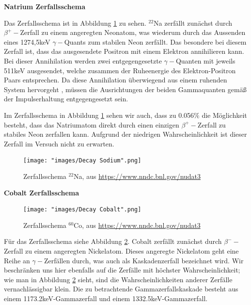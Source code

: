 \documentclass[%
aps,
onecolumn,
11pt,
tightenlines,
nofootinbib,
superscriptaddress,
floatfix,
prd,
]{revtex4-2}
\begin{document}
\textbf{Natrium Zerfallsschema} \par
Das Zerfallsschema ist in Abbildung \ref{fig:decaysodium} zu sehen. $^{22}$Na zerfällt zunächst durch $\beta^+ -$Zerfall zu einem angeregten Neonatom, was wiederum durch das Aussenden eines 1274,5keV $\gamma-$Quants zum stabilen Neon zerfällt. Das besondere bei diesem Zerfall ist, dass das ausgesendete Positron mit einem Elektron annihilieren kann. Bei dieser Annihilation werden zwei entgegengesetzte $\gamma-$Quanten mit jeweils 511keV ausgesendet, welche zusammen der Ruheenergie des Elektron-Positron Paars entsprechen. Da diese Annihilation überwiegend aus einem ruhenden System hervorgeht \cite{manual1}, müssen die Ausrichtungen der beiden Gammaquanten gemäß der Impulserhaltung entgegengesetzt sein. \par
Im Zerfallsschema in Abbildung \ref{fig:decaysodium} sehen wir auch, dass zu 0.056$\%$ die Möglichkeit besteht, dass das Natriumatom direkt durch einen einzigen $\beta^+ -$Zerfall zu stabiles Neon zerfallen kann. Aufgrund der niedrigen Wahrscheinlichkeit ist dieser Zerfall im Versuch nicht zu erwarten.
\begin{figure}[ht]
	\texttt{[image: "images/Decay Sodium".png]}
	\caption{Zerfallsschema $^{22}$Na, aus \url{https://www.nndc.bnl.gov/nudat3}\cite{BASUNIA201569}}
	\label{fig:decaysodium}
\end{figure}

\noindent \textbf{Cobalt Zerfallsschema}\\
\begin{figure}[ht]
	\texttt{[image: "images/Decay Cobalt".png]}
	\caption{Zerfallsschema $^{60}$Co, aus \url{https://www.nndc.bnl.gov/nudat3}\cite{BROWNE20131849}}
	\label{fig:decaycobalt}
\end{figure}
Für das Zerfallsschema siehe Abbildung \ref{fig:decaycobalt}. Cobalt zerfällt zunächst durch $\beta^- -$Zerfall zu einem angeregten Nickelatom. Dieses angeregte Nickelatom geht eine Reihe an $\gamma -$Zerfällen durch, was auch als Kaskadenzerfall bezeichnet wird. Wir beschränken uns hier ebenfalls auf die Zerfälle mit höchster Wahrscheinlichkeit; wie man in Abbildung \ref{fig:decaycobalt} sieht, sind die Wahrscheinlichkeiten anderer Zerfälle vernachlässigbar klein. Die zu betrachtende Gammazerfallskaskade besteht aus einem 1173.2keV-Gammazerfall und einem 1332.5keV-Gammazerfall. 
\end{document}
